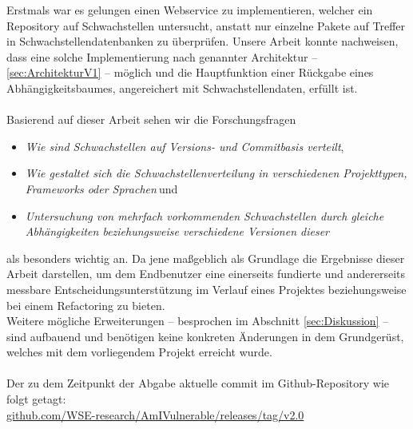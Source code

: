     Erstmals war es gelungen einen Webservice zu implementieren, welcher ein Repository auf Schwachstellen untersucht, anstatt nur einzelne Pakete auf Treffer in Schwachstellendatenbanken zu überprüfen.
    Unsere Arbeit konnte nachweisen, dass eine solche Implementierung nach genannter Architektur -- \ref{sec:ArchitekturV1} -- möglich und die Hauptfunktion einer Rückgabe eines Abhängigkeitsbaumes, angereichert mit Schwachstellendaten, erfüllt ist.
    \\ \\
    Basierend auf dieser Arbeit sehen wir die Forschungsfragen
    \begin{itemize}
        \item \glqq \textit{Wie sind Schwachstellen auf Versions- und Commitbasis verteilt}\grqq,
        \item \glqq \textit{Wie gestaltet sich die Schwachstellenverteilung in verschiedenen Projekttypen, Frameworks oder Sprachen}\grqq$~$und
        \item \glqq \textit{Untersuchung von mehrfach vorkommenden Schwachstellen durch gleiche Abhängigkeiten beziehungsweise verschiedene Versionen dieser}\grqq
    \end{itemize}
    als besonders wichtig an.
    Da jene maßgeblich als Grundlage die Ergebnisse dieser Arbeit darstellen, um dem Endbenutzer eine einerseits fundierte und andererseits messbare Entscheidungsunterstützung im Verlauf eines Projektes beziehungsweise bei einem Refactoring zu bieten.
    \\
    Weitere mögliche Erweiterungen -- besprochen im Abschnitt \ref{sec:Diskussion}  -- sind aufbauend und benötigen keine konkreten Änderungen in dem Grundgerüst, welches mit dem vorliegendem Projekt erreicht wurde.
    \\ \\
    Der zu dem Zeitpunkt der Abgabe aktuelle commit im Github-Repository wie folgt getagt: \\
    \href{https://github.com/WSE-research/AmIVulnerable/releases/tag/v2.0}{github.com/WSE-research/AmIVulnerable/releases/tag/v2.0}
